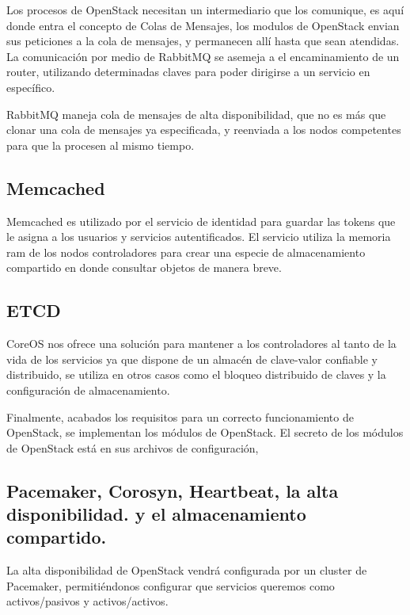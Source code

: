     Los procesos de OpenStack necesitan un intermediario que los comunique, es aquí donde entra el concepto de Colas de Mensajes, los modulos de OpenStack envian sus peticiones a la cola de mensajes, y permanecen allí hasta que sean atendidas. La comunicación por medio de RabbitMQ se asemeja a el encaminamiento de un router, utilizando determinadas claves para poder dirigirse a un servicio en específico.
    
    
    RabbitMQ maneja cola de mensajes de alta disponibilidad, que no es más que clonar una cola de mensajes ya especificada, y reenviada a los nodos competentes para que la procesen al mismo tiempo.
    
    \subsection{Memcached}
    
    Memcached es utilizado por el servicio de identidad para guardar las tokens que le asigna a los usuarios y servicios autentificados. El servicio utiliza la memoria ram de los nodos controladores para crear una especie de almacenamiento compartido en donde consultar objetos de manera breve.
    
    \subsection{ETCD}
    
    CoreOS nos ofrece una solución para mantener a los controladores al tanto de la vida de los servicios ya que dispone de un almacén de clave-valor confiable y distribuido, se utiliza en otros casos como el bloqueo distribuido de claves y la configuración de almacenamiento.
    
    Finalmente, acabados los requisitos para un correcto funcionamiento de OpenStack, se implementan los módulos de OpenStack. El secreto de los módulos de OpenStack está en sus archivos de configuración,
    
    
    \subsection{Pacemaker, Corosyn, Heartbeat, la alta disponibilidad. y el almacenamiento compartido.}
    
    La alta disponibilidad de OpenStack vendrá configurada por un cluster de Pacemaker, permitiéndonos configurar que servicios queremos como activos/pasivos y activos/activos. 
    
